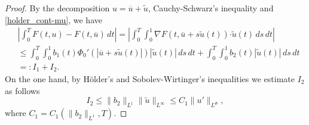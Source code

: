 \documentclass[twoside]{article}
\theoremstyle{remark}
\newcommand{\orlnor}{\|_{L^{\Phi}}}
\renewcommand{\b}[1]{\boldsymbol{#1}}
\newcommand{\ccdot}{\b{\cdot}}
\renewcommand{\leq}{\leqslant}
\begin{document}
\begin{proof}
By the decomposition $u=\overline{u}+\tilde{u}$,   Cauchy-Schwarz's inequality
and \eqref{holder_cont-mu}, we have
\begin{equation}\label{cota-diferencia-F}
\begin{split}
&\left|\int_0^T F(t,u)-F(t,\overline{u})\,dt\right|=
\left|\int_0^T \int_0^1 \nabla F(t,\overline{u}+s\tilde{u}(t))\ccdot \tilde{u}(t) \,ds \,dt\right|
\\
&\leq \int_0^T \int_0^1 b_1(t)\Phi_0'(|\overline{u}+s\tilde{u}(t)|)|\tilde{u}(t)|\,ds\,dt+
\int_0^T \int_0^1 b_2(t)|\tilde{u}(t)|\,ds\,dt
\\
&=:I_1+I_2.
\end{split}
\end{equation}
On the one hand, by H\"older's and Sobolev-Wirtinger's inequalities we estimate $I_2$ as follows
\begin{equation}\label{cota-i2}
I_2\leq \|b_2\|_{L^1} \|\tilde{u}\|_{L^{\infty}}\leq
C_1\|u'\orlnor,
\end{equation}
 where $C_1=C_1(\|b_2\|_{L^1}, T)$. 


\end{proof}
\end{document}
